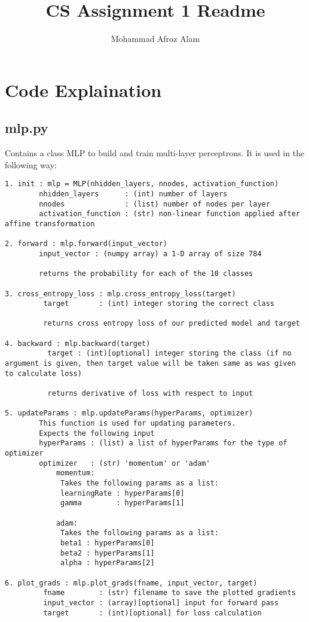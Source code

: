 \documentclass{article}
\author{Mohammad Afroz Alam}
\date{}
\title{CS Assignment 1 Readme}
\begin{document}
\maketitle

\section{Code Explaination}
\subsection{mlp.py}
Contains a class MLP to build and train multi-layer perceptrons. It is used in the following way:
\begin{verbatim}
1. init : mlp = MLP(nhidden_layers, nnodes, activation_function)
        nhidden_layers      : (int) number of layers
        nnodes              : (list) number of nodes per layer
        activation_function : (str) non-linear function applied after affine transformation

2. forward : mlp.forward(input_vector)
        input_vector : (numpy array) a 1-D array of size 784

        returns the probability for each of the 10 classes

3. cross_entropy_loss : mlp.cross_entropy_loss(target)
         target       : (int) integer storing the correct class

         returns cross entropy loss of our predicted model and target

4. backward : mlp.backward(target)
          target : (int)[optional] integer storing the class (if no argument is given, then target value will be taken same as was given to calculate loss)

          returns derivative of loss with respect to input

5. updateParams : mlp.updateParams(hyperParams, optimizer)
        This function is used for updating parameters.
        Expects the following input
        hyperParams : (list) a list of hyperParams for the type of optimizer
        optimizer   : (str) 'momentum' or 'adam'
            momentum:
             Takes the following params as a list:
             learningRate : hyperParams[0]
             gamma        : hyperParams[1]

            adam:
             Takes the following params as a list:
             beta1 : hyperParams[0]
             beta2 : hyperParams[1]
             alpha : hyperParams[2]

6. plot_grads : mlp.plot_grads(fname, input_vector, target)
         fname        : (str) filename to save the plotted gradients
         input_vector : (array)[optional] input for forward pass
         target       : (int)[optional] for loss calculation


\end{verbatim}
\end{document}
